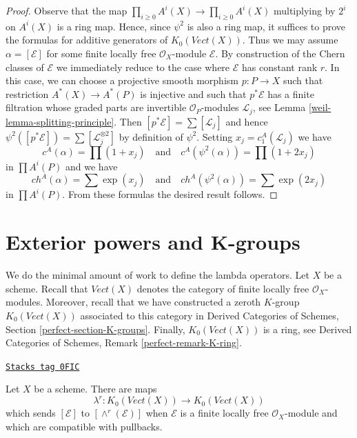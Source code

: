 \begin{proof}

Observe that the map $\prod_{i \geq 0} A^i(X) \to \prod_{i \geq 0} A^i(X)$
multiplying by $2^i$ on $A^i(X)$ is a ring map. Hence, since $\psi^2$
is also a ring map, it suffices to prove the formulas for additive generators
of $K_0(\textit{Vect}(X))$. Thus we may assume $\alpha = [\mathcal{E}]$
for some finite locally free $\mathcal{O}_X$-module $\mathcal{E}$.
By construction of the Chern classes of $\mathcal{E}$ we immediately
reduce to the case where $\mathcal{E}$ has constant rank $r$.
In this case, we can choose a projective smooth morphism $p : P \to X$
such that restriction $A^*(X) \to A^*(P)$ is injective
and such that $p^*\mathcal{E}$ has a finite filtration whose
graded parts are invertible $\mathcal{O}_P$-modules $\mathcal{L}_j$, see
Lemma \ref{weil-lemma-splitting-principle}. Then
$[p^*\mathcal{E}] = \sum [\mathcal{L}_j]$ and hence
$\psi^2([p^*\mathcal{E}]) = \sum [\mathcal{L}_j^{\otimes 2}]$
by definition of $\psi^2$. Setting $x_j  = c^A_1(\mathcal{L}_j)$
we have
$$
c^A(\alpha) = \prod (1 + x_j)
\quad\text{and}\quad
c^A(\psi^2(\alpha)) = \prod (1 + 2 x_j)
$$
in $\prod A^i(P)$ and we have
$$
ch^A(\alpha) = \sum \exp(x_j)
\quad\text{and}\quad
ch^A(\psi^2(\alpha)) = \sum \exp(2 x_j)
$$
in $\prod A^i(P)$. From these formulas the desired result follows.
\end{proof}

\section{Exterior powers and K-groups}
\label{weil-section-lambda-operations}
We do the minimal amount of work to define the lambda operators.
Let $X$ be a scheme. Recall that $\textit{Vect}(X)$ denotes the
category of finite locally free $\mathcal{O}_X$-modules.
Moreover, recall that we have constructed a zeroth $K$-group
$K_0(\textit{Vect}(X))$ associated to this category in
Derived Categories of Schemes, Section \ref{perfect-section-K-groups}.
Finally, $K_0(\textit{Vect}(X))$ is a ring, see
Derived Categories of Schemes, Remark \ref{perfect-remark-K-ring}.

\begin{lemma}
\label{weil-lemma-lambda-operations}
\href{https://stacks.math.columbia.edu/tag/0FIC}{\texttt{Stacks tag 0FIC}}

Let $X$ be a scheme. There are maps
$$
\lambda^r : K_0(\textit{Vect}(X)) \longrightarrow K_0(\textit{Vect}(X))
$$
which sends $[\mathcal{E}]$ to $[\wedge^r(\mathcal{E})]$
when $\mathcal{E}$ is a finite locally free $\mathcal{O}_X$-module
and which are compatible with pullbacks.
\end{lemma}

